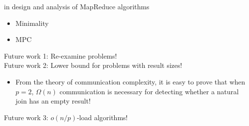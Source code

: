 \documentclass{beamer}
\def\vgap{\vspace{5mm}}
\begin{document}
\begin{frame}
\begin{small}
    
    \vgap 
    
    
     in design and analysis of MapReduce algorithms 
    \begin{itemize} 
        \item Minimality 
        \item MPC
    \end{itemize}

    
    \vgap \pause
    
    Future work 1: Re-examine  problems! \\ \pause
    Future work 2: Lower bound for problems with  result sizes! 
    \begin{itemize} 
        \item From the theory of communication complexity, it is easy to prove that when $p = 2$, $\Omega(n)$ communication is necessary for detecting whether a natural join has an empty result! \pause
    \end{itemize}
    Future work 3: $o(n/p)$-load algorithms! 
    
\end{small}
\end{frame}
\end{document}
